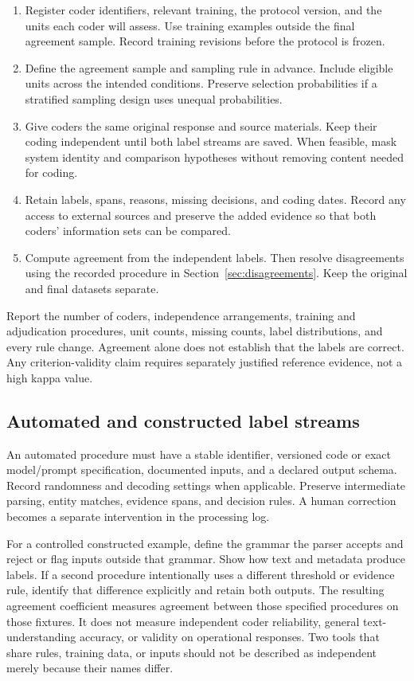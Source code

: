 \documentclass[10pt,a4paper]{article}
\begin{document}
\begin{enumerate}
\item Register coder identifiers, relevant training, the protocol version, and the units each coder will assess. Use training examples outside the final agreement sample. Record training revisions before the protocol is frozen.
\item Define the agreement sample and sampling rule in advance. Include eligible units across the intended conditions. Preserve selection probabilities if a stratified sampling design uses unequal probabilities.
\item Give coders the same original response and source materials. Keep their coding independent until both label streams are saved. When feasible, mask system identity and comparison hypotheses without removing content needed for coding.
\item Retain labels, spans, reasons, missing decisions, and coding dates. Record any access to external sources and preserve the added evidence so that both coders' information sets can be compared.
\item Compute agreement from the independent labels. Then resolve disagreements using the recorded procedure in Section~\ref{sec:disagreements}. Keep the original and final datasets separate.
\end{enumerate}

Report the number of coders, independence arrangements, training and adjudication procedures, unit counts, missing counts, label distributions, and every rule change. Agreement alone does not establish that the labels are correct. Any criterion-validity claim requires separately justified reference evidence, not a high kappa value.

\subsection{Automated and constructed label streams}
An automated procedure must have a stable identifier, versioned code or exact model/prompt specification, documented inputs, and a declared output schema. Record randomness and decoding settings when applicable. Preserve intermediate parsing, entity matches, evidence spans, and decision rules. A human correction becomes a separate intervention in the processing log.

For a controlled constructed example, define the grammar the parser accepts and reject or flag inputs outside that grammar. Show how text and metadata produce labels. If a second procedure intentionally uses a different threshold or evidence rule, identify that difference explicitly and retain both outputs. The resulting agreement coefficient measures agreement between those specified procedures on those fixtures. It does not measure independent coder reliability, general text-understanding accuracy, or validity on operational responses. Two tools that share rules, training data, or inputs should not be described as independent merely because their names differ.
\end{document}
